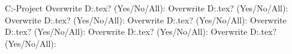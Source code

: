 C:\Users\admin\Skills-Project\cp
Overwrite D:\main.tex? (Yes/No/All): Overwrite D:\main.tex? (Yes/No/All): Overwrite D:\main.tex? (Yes/No/All): Overwrite D:\main.tex? (Yes/No/All): Overwrite D:\main.tex? (Yes/No/All): Overwrite D:\main.tex? (Yes/No/All): Overwrite D:\main.tex? (Yes/No/All): 